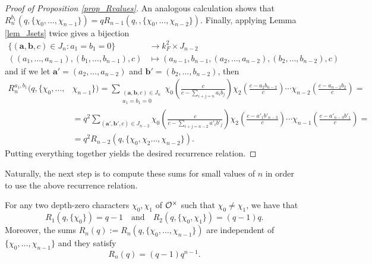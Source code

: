\begin{proof}[Proof of Proposition \ref{prop_Rvalues}]
        An analogous calculation shows that $R_n^{b_1}(q,\{\chi_0,\ldots,\chi_{n-1}\})=qR_{n-1}(q,,\{\chi_0,\ldots,\chi_{n-2}\})$. Finally, applying Lemma \ref{lem_Jsets} twice gives a bijection 
        \begin{align*}
            \{(\mathbf{a},\mathbf{b},c)\in J_n:a_1=b_1=0\}&\longrightarrow k_F^2\times J_{n-2}\\
            ((a_1,\ldots,a_{n-1}),(b_1,\ldots,b_{n-1}),c)&\longmapsto (a_{n-1},b_{n-1},(a_2,\ldots,a_{n-2}),(b_2,\ldots,b_{n-2}),c)
        \end{align*}
        and if we let $\mathbf{a}'=(a_2,\ldots,a_{n-2})$ and $\mathbf{b}'=(b_2,\ldots,b_{n-2})$, then
        \begin{align*}
            R_n^{a_1,b_1}(q,\{\chi_0,\ldots,&\chi_{n-1}\})=\sum_{\substack{(\mathbf{a},\mathbf{b},c)\in J_n\\ a_1=b_1=0}}\chi_0\left(\frac{c}{c-\sum_{i+j=n}a_ib_j}\right)\chi_2\left(\frac{c-a_2b_{n-2}}{c}\right)%
            \cdots\chi_{n-2}\left(\frac{c-a_{n-2}b_2}{c}\right)=\\
            &=q^2\sum_{(\mathbf{a}',\mathbf{b}',c)\in J_{n-2}}\chi_0\left(\frac{c}{c-\sum_{i+j=n-2}a'_ib'_j}\right)\chi_2\left(\frac{c-a'_1b'_{n-3}}{c}\right)%
            \cdots\chi_{n-1}\left(\frac{c-a'_{n-3}b'_1}{c}\right)=\\
            &=q^2R_{n-2}(q,\{\chi_0,\chi_2\ldots,\chi_{n-2}\}).
        \end{align*}
        Putting everything together yields the desired recurrence relation.
    \end{proof}

    Naturally, the next step is to compute these sums for small values of $n$ in order to use the above recurrence relation.

    \begin{proposition}
        For any two depth-zero characters $\chi_0,\chi_1$ of $\mathcal{O}^\times$ such that $\chi_0\neq\chi_1$, we have that 
        \begin{equation}\label{eqn_Rinitial}
            R_1(q,\{\chi_0\})=q-1\quad\text{and}\quad R_2(q,\{\chi_0,\chi_1\})=(q-1)q.
        \end{equation}
        Moreover, the sums $R_n(q):=R_n(q,\{\chi_0,\ldots,\chi_{n-1}\})$ are independent of $\{\chi_0,\ldots,\chi_{n-1}\}$ and they satisfy $$R_n(q)=(q-1)q^{n-1}.$$
    \end{proposition}


